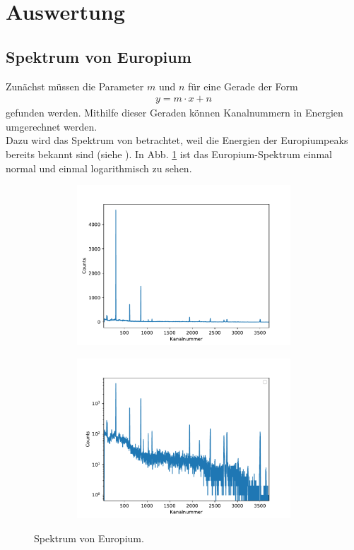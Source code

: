 \section{Auswertung}

  \subsection{Spektrum von Europium}

   \raggedright

    Zunächst müssen die Parameter
    $m$ und $n$ für eine Gerade der Form
    \begin{align*}
      y = m\cdot x+n
    \end{align*}
    gefunden werden. Mithilfe dieser Geraden können Kanalnummern in
    Energien umgerechnet werden.\\
    Dazu wird das Spektrum von  betrachtet, weil die Energien
    der Europiumpeaks bereits bekannt sind (siehe \cite{anleitungv18}).
    In Abb. \ref{fig:euro} ist das Europium-Spektrum einmal
    normal und einmal logarithmisch zu sehen.



    \begin{figure}[H]
      \centering
      \begin{subfigure}{0.495\textwidth}
        \centering
        \includegraphics[height=6cm, width = 1\textwidth]{germania/eu_allgemein/europium.pdf}
      \end{subfigure}
      \begin{subfigure}{0.495\textwidth}
        \centering
        \includegraphics[height=6cm, width = 1\textwidth]{germania/eu_allgemein/europilog.pdf}
      \end{subfigure}
      \caption{Spektrum von Europium.}
      \label{fig:euro}
    \end{figure}

